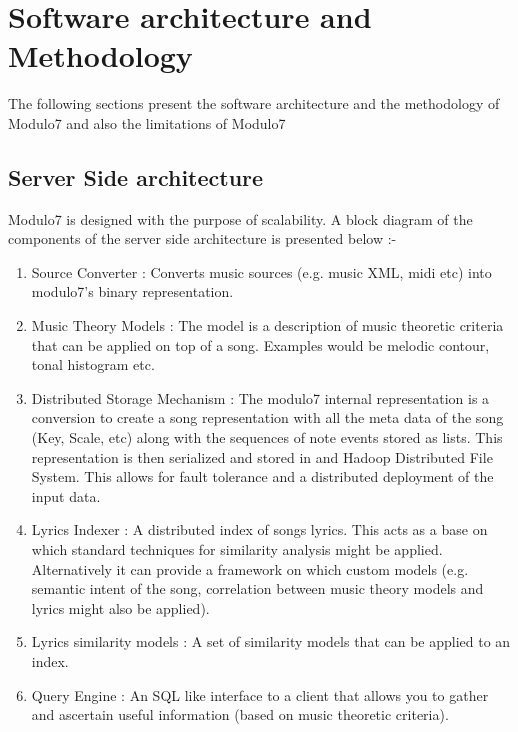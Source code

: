\chapter{Software architecture and Methodology}
The following sections present the software architecture and the methodology of Modulo7 and also the limitations of Modulo7
\section{Server Side architecture}
\noindent Modulo7 is designed with the purpose of scalability. A block diagram of the components of the server side architecture is presented below :-
\begin{enumerate}
\item Source Converter : Converts music sources (e.g. music XML, midi etc) into modulo7's binary representation.
\item Music Theory Models : The model is a description of music theoretic criteria that can be applied on top of a song. Examples would be melodic contour, tonal histogram etc. 
\item Distributed Storage Mechanism : The modulo7 internal representation is a conversion to create a song representation with all the meta data of the song (Key, Scale,  etc) along with the sequences of note events stored as lists. This representation is then serialized and stored in and Hadoop Distributed File System. This allows for fault tolerance and a distributed deployment of the input data.
\item Lyrics Indexer : A distributed index of songs lyrics. This acts as a base on which standard techniques for similarity analysis might be applied. Alternatively it can provide a framework on which custom models (e.g. semantic intent of the song, correlation between music theory models and lyrics might also be applied).  
\item Lyrics similarity models : A set of similarity models that can be applied to an index. 
\item Query Engine : An SQL like interface to a client that allows you to gather and ascertain useful information (based on music theoretic criteria). 
\end{enumerate}

